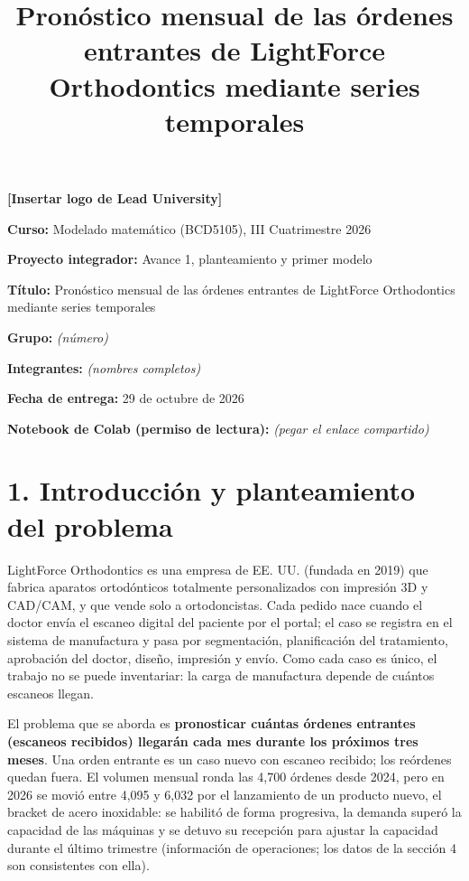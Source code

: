 \documentclass[
  spanish,
  11pt,
]{article}
\title{Pronóstico mensual de las órdenes entrantes de LightForce
Orthodontics mediante series temporales}
\author{}
\date{}
\begin{document}
\maketitle

\textbf{{[}Insertar logo de Lead University{]}}

\textbf{Curso:} Modelado matemático (BCD5105), III Cuatrimestre 2026

\textbf{Proyecto integrador:} Avance 1, planteamiento y primer modelo

\textbf{Título:} Pronóstico mensual de las órdenes entrantes de
LightForce Orthodontics mediante series temporales

\textbf{Grupo:} \emph{(número)}

\textbf{Integrantes:} \emph{(nombres completos)}

\textbf{Fecha de entrega:} 29 de octubre de 2026

\textbf{Notebook de Colab (permiso de lectura):} \emph{(pegar el enlace
compartido)}

\newpage

\section{1. Introducción y planteamiento del
problema}\label{introducciuxf3n-y-planteamiento-del-problema}

LightForce Orthodontics es una empresa de EE. UU. (fundada en 2019) que
fabrica aparatos ortodónticos totalmente personalizados con impresión 3D
y CAD/CAM, y que vende solo a ortodoncistas. Cada pedido nace cuando el
doctor envía el escaneo digital del paciente por el portal; el caso se
registra en el sistema de manufactura y pasa por segmentación,
planificación del tratamiento, aprobación del doctor, diseño, impresión
y envío. Como cada caso es único, el trabajo no se puede inventariar: la
carga de manufactura depende de cuántos escaneos llegan.

El problema que se aborda es \textbf{pronosticar cuántas órdenes
entrantes (escaneos recibidos) llegarán cada mes durante los próximos
tres meses}. Una orden entrante es un caso nuevo con escaneo recibido;
los reórdenes quedan fuera. El volumen mensual ronda las 4,700 órdenes
desde 2024, pero en 2026 se movió entre 4,095 y 6,032 por el lanzamiento
de un producto nuevo, el bracket de acero inoxidable: se habilitó de
forma progresiva, la demanda superó la capacidad de las máquinas y se
detuvo su recepción para ajustar la capacidad durante el último
trimestre (información de operaciones; los datos de la sección 4 son
consistentes con ella).
\end{document}
